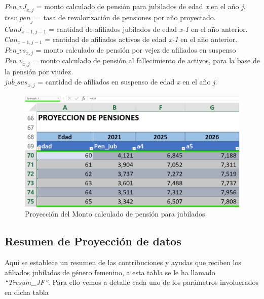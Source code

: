 \documentclass[
  letterpaper,
  DIV=11,
  numbers=noendperiod]{scrreprt}
\begin{document}
\({Pen\_vJ}_{x,j}\) = monto calculado de pensión para jubilados de edad
\emph{x} en el año \emph{j}.\\
\({trev\_{pen}}_j\) = tasa de revalorización de pensiones por año
proyectado.\\
\({CanJ}_{x-1,j-1}\) = cantidad de afiliados jubilados de edad
\emph{x-1} en el año anterior.\\
\(Can_{x-1,j-1}\) = cantidad de afiliados activos de edad \emph{x-1} en
el año anterior.\\
\({Pen\_vs}_{x,j}\) = monto calculado de pensión por vejez de afiliados
en suspenso\\
\({Pen\_v}_{x,j}\) = monto calculado de pensión al fallecimiento de
activos, para la base de la pensión por viudez.\\
\({jub\_sus}_{x,j}\) = cantidad de afiliados en suspenso de edad
\emph{x} en el año \emph{j}.

\begin{figure}

{\centering \includegraphics{images/F/Img28.png}

}

\caption{Proyección del Monto calculado de pensión para jubilados}

\end{figure}

\hypertarget{resumen-de-proyecciuxf3n-de-datos-1}{%
\subsection{Resumen de Proyección de
datos}\label{resumen-de-proyecciuxf3n-de-datos-1}}

Aquí se establece un resumen de las contribuciones y ayudas que reciben
los afiliados jubilados de género femenino, a esta tabla se le ha
llamado \emph{``Tresum\_JF''}. Para ello vemos a detalle cada uno de los
parámetros involucrados en dicha tabla
\end{document}
